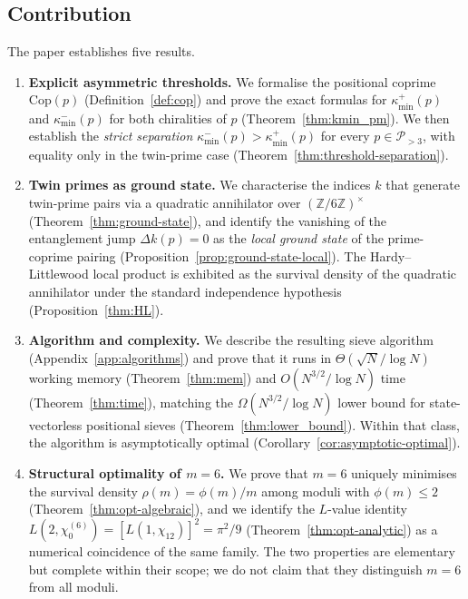 \documentclass[11pt]{amsart}
\numberwithin{equation}{section}
\newcommand{\ZZ}{\mathbb{Z}}
\newcommand{\cP}{\mathcal{P}}
\newcommand{\kminp}{\kappa_{\min}^{+}}
\newcommand{\kminm}{\kappa_{\min}^{-}}
\newcommand{\Cop}{\mathrm{Cop}}
\theoremstyle{plain}
\theoremstyle{definition}
\begin{document}
\subsection{Contribution}

The paper establishes five results.

\begin{enumerate}

\item \textbf{Explicit asymmetric thresholds.} We formalise the
  positional coprime $\Cop(p)$ (Definition~\ref{def:cop}) and prove
  the exact formulas for $\kminp(p)$ and $\kminm(p)$ for both
  chiralities of $p$ (Theorem~\ref{thm:kmin_pm}). We then establish
  the \emph{strict separation}
  $\kminm(p)>\kminp(p)$ for every $p\in\cP_{>3}$, with equality only
  in the twin-prime case (Theorem~\ref{thm:threshold-separation}).

\item \textbf{Twin primes as ground state.} We characterise the
  indices $k$ that generate twin-prime pairs via a quadratic
  annihilator over $(\ZZ/6\ZZ)^\times$
  (Theorem~\ref{thm:ground-state}), and identify the vanishing of the
  entanglement jump $\Delta k(p)=0$ as the \emph{local ground state}
  of the prime-coprime pairing
  (Proposition~\ref{prop:ground-state-local}). The
  Hardy--Littlewood local product is exhibited as the survival
  density of the quadratic annihilator under the standard
  independence hypothesis (Proposition~\ref{thm:HL}).

\item \textbf{Algorithm and complexity.} We describe the resulting
  sieve algorithm (Appendix~\ref{app:algorithms}) and prove that it
  runs in $\Theta(\sqrt{N}/\log N)$ working memory
  (Theorem~\ref{thm:mem}) and $O(N^{3/2}/\log N)$ time
  (Theorem~\ref{thm:time}), matching the
  $\Omega(N^{3/2}/\log N)$ lower bound for state-vectorless
  positional sieves (Theorem~\ref{thm:lower_bound}). Within that
  class, the algorithm is asymptotically optimal
  (Corollary~\ref{cor:asymptotic-optimal}).

\item \textbf{Structural optimality of $m=6$.} We prove that $m=6$
  uniquely minimises the survival density $\rho(m)=\phi(m)/m$ among
  moduli with $\phi(m)\le 2$
  (Theorem~\ref{thm:opt-algebraic}), and we identify the $L$-value
  identity $L(2,\chi_0^{(6)})=[L(1,\chi_{12})]^2=\pi^2/9$
  (Theorem~\ref{thm:opt-analytic}) as a numerical coincidence of the
  same family. The two properties are elementary but complete within
  their scope; we do not claim that they distinguish $m=6$ from all
  moduli.


\end{enumerate}
\end{document}
